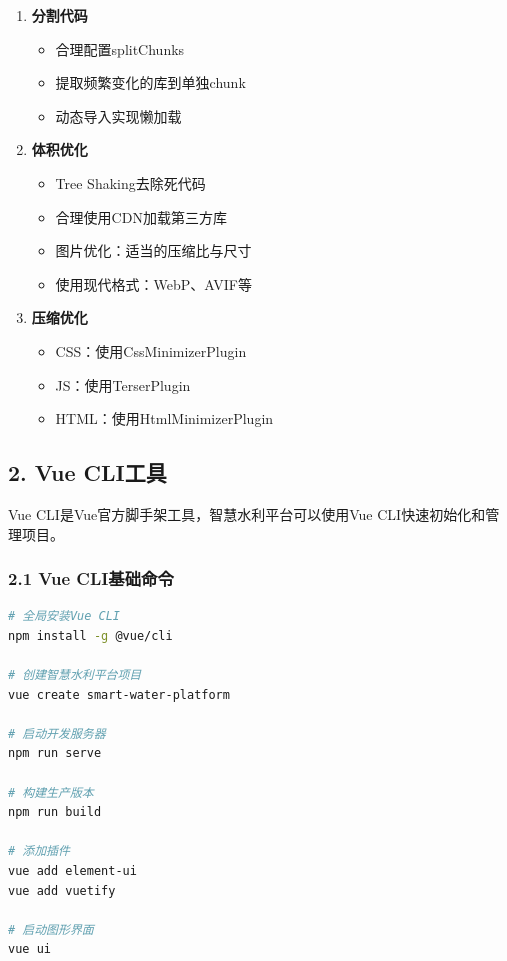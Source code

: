 \begin{enumerate}
\def\labelenumi{\arabic{enumi}.}
\tightlist
\item
  \textbf{分割代码}

  \begin{itemize}
  \tightlist
  \item
    合理配置splitChunks
  \item
    提取频繁变化的库到单独chunk
  \item
    动态导入实现懒加载
  \end{itemize}
\item
  \textbf{体积优化}

  \begin{itemize}
  \tightlist
  \item
    Tree Shaking去除死代码
  \item
    合理使用CDN加载第三方库
  \item
    图片优化：适当的压缩比与尺寸
  \item
    使用现代格式：WebP、AVIF等
  \end{itemize}
\item
  \textbf{压缩优化}

  \begin{itemize}
  \tightlist
  \item
    CSS：使用CssMinimizerPlugin
  \item
    JS：使用TerserPlugin
  \item
    HTML：使用HtmlMinimizerPlugin
  \end{itemize}
\end{enumerate}

\subsection{2. Vue CLI工具}\label{vue-cliux5de5ux5177}

Vue CLI是Vue官方脚手架工具，智慧水利平台可以使用Vue
CLI快速初始化和管理项目。

\subsubsection{2.1 Vue
CLI基础命令}\label{vue-cliux57faux7840ux547dux4ee4}

\begin{lstlisting}[language=bash]
# 全局安装Vue CLI
npm install -g @vue/cli

# 创建智慧水利平台项目
vue create smart-water-platform

# 启动开发服务器
npm run serve

# 构建生产版本
npm run build

# 添加插件
vue add element-ui
vue add vuetify

# 启动图形界面
vue ui
\end{lstlisting}

